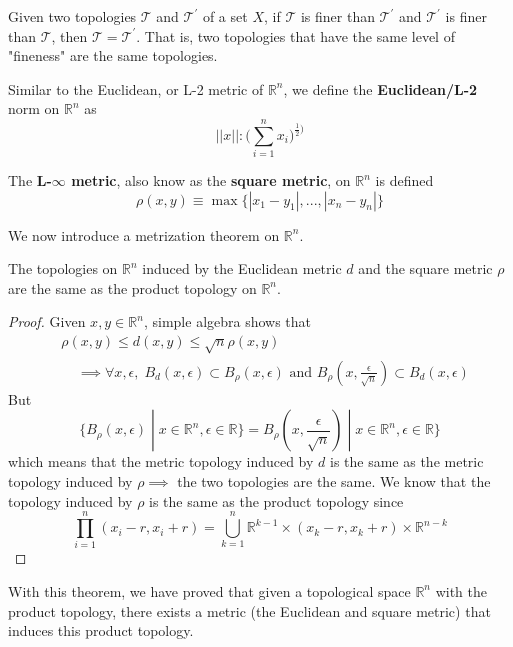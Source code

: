   \begin{corollary}
  Given two topologies $\mathscr{T}$ and $\mathscr{T}^\prime$ of a set $X$, if $\mathscr{T}$ is finer than $\mathscr{T}^\prime$ and $\mathscr{T}^\prime$ is finer than $\mathscr{T}$, then $\mathscr{T} = \mathscr{T}^\prime$. That is, two topologies that have the same level of "fineness" are the same topologies. 
  \end{corollary}

  \begin{definition}
  Similar to the Euclidean, or L-2 metric of $\mathbb{R}^n$, we define the \textbf{Euclidean/L-2} norm on $\mathbb{R}^n$ as
  \[||x||: \bigg( \sum_{i=1}^n x_i \bigg)^{\frac{1}{2})}\]
  \end{definition}

  \begin{definition}
  The \textbf{L-$\infty$ metric}, also know as the \textbf{square metric}, on $\mathbb{R}^n$ is defined 
  \[\rho(x, y) \equiv \max{\{|x_1 - y_1|, ..., |x_n - y_n|\}}\]
  \end{definition}

  We now introduce a metrization theorem on $\mathbb{R}^n$. 

  \begin{theorem}
  The topologies on $\mathbb{R}^n$ induced by the Euclidean metric $d$ and the square metric $\rho$ are the same as the product topology on $\mathbb{R}^n$. 
  \end{theorem}
  \begin{proof}
  Given $x, y \in \mathbb{R}^n$, simple algebra shows that 
  \begin{align*}
      & \rho(x, y) \leq d(x, y) \leq \sqrt{n} \rho(x, y) \\
      & \;\;\;\; \implies \forall x, \epsilon, \; B_d (x, \epsilon) \subset B_\rho (x, \epsilon) \text{ and } B_\rho (x, \frac{\epsilon}{\sqrt{n}}) \subset B_d (x, \epsilon)
  \end{align*}
  But
  \[\{ B_\rho (x, \epsilon) \; | \; x \in \mathbb{R}^n, \epsilon \in \mathbb{R}\} = B_\rho (x, \frac{\epsilon}{\sqrt{n}}) \; | \; x \in \mathbb{R}^n, \epsilon \in \mathbb{R}\}\]
  which means that the metric topology induced by $d$ is the same as the metric topology induced by $\rho \implies$ the two topologies are the same. We know that the topology induced by $\rho$ is the same as the product topology since 
  \[\prod_{i=1}^n (x_i - r, x_i + r) = \bigcup_{k=1}^n \mathbb{R}^{k-1} \times (x_k - r, x_k + r) \times \mathbb{R}^{n-k}\]
  \end{proof}
  With this theorem, we have proved that given a topological space $\mathbb{R}^n$ with the product topology, there exists a metric (the Euclidean and square metric) that induces this product topology. 

